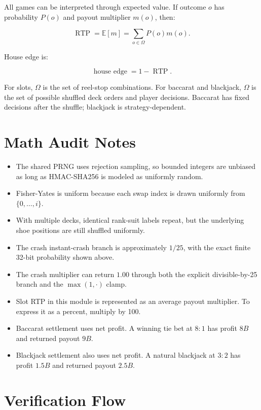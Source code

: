 \documentclass[11pt]{article}
\begin{document}
All games can be interpreted through expected value. If outcome \(o\) has probability \(P(o)\) and payout multiplier \(m(o)\), then:

\[
\operatorname{RTP}=\mathbb{E}[m]=\sum_{o\in\Omega}P(o)m(o).
\]

House edge is:

\[
\operatorname{house\ edge}=1-\operatorname{RTP}.
\]

For slots, \(\Omega\) is the set of reel-stop combinations. For baccarat and blackjack, \(\Omega\) is the set of possible shuffled deck orders and player decisions. Baccarat has fixed decisions after the shuffle; blackjack is strategy-dependent.

\section{Math Audit Notes}

\begin{itemize}
    \item The shared PRNG uses rejection sampling, so bounded integers are unbiased as long as HMAC-SHA256 is modeled as uniformly random.
    \item Fisher-Yates is uniform because each swap index is drawn uniformly from \(\{0,\ldots,i\}\).
    \item With multiple decks, identical rank-suit labels repeat, but the underlying shoe positions are still shuffled uniformly.
    \item The crash instant-crash branch is approximately \(1/25\), with the exact finite 32-bit probability shown above.
    \item The crash multiplier can return \(1.00\) through both the explicit divisible-by-25 branch and the \(\max(1,\cdot)\) clamp.
    \item Slot RTP in this module is represented as an average payout multiplier. To express it as a percent, multiply by 100.
    \item Baccarat settlement uses net profit. A winning tie bet at \(8{:}1\) has profit \(8B\) and returned payout \(9B\).
    \item Blackjack settlement also uses net profit. A natural blackjack at \(3{:}2\) has profit \(1.5B\) and returned payout \(2.5B\).
\end{itemize}

\section{Verification Flow}
\end{document}

